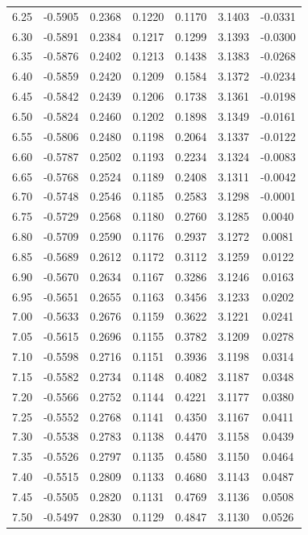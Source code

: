 \begin{longtable}{|c|c|c|c|c|c|c|}
6.25 & -0.5905 & 0.2368 & 0.1220 & 0.1170 & 3.1403 & -0.0331 \\
6.30 & -0.5891 & 0.2384 & 0.1217 & 0.1299 & 3.1393 & -0.0300 \\
6.35 & -0.5876 & 0.2402 & 0.1213 & 0.1438 & 3.1383 & -0.0268 \\
6.40 & -0.5859 & 0.2420 & 0.1209 & 0.1584 & 3.1372 & -0.0234 \\
6.45 & -0.5842 & 0.2439 & 0.1206 & 0.1738 & 3.1361 & -0.0198 \\
6.50 & -0.5824 & 0.2460 & 0.1202 & 0.1898 & 3.1349 & -0.0161 \\
6.55 & -0.5806 & 0.2480 & 0.1198 & 0.2064 & 3.1337 & -0.0122 \\
6.60 & -0.5787 & 0.2502 & 0.1193 & 0.2234 & 3.1324 & -0.0083 \\
6.65 & -0.5768 & 0.2524 & 0.1189 & 0.2408 & 3.1311 & -0.0042 \\
6.70 & -0.5748 & 0.2546 & 0.1185 & 0.2583 & 3.1298 & -0.0001 \\
6.75 & -0.5729 & 0.2568 & 0.1180 & 0.2760 & 3.1285 & 0.0040 \\
6.80 & -0.5709 & 0.2590 & 0.1176 & 0.2937 & 3.1272 & 0.0081 \\
6.85 & -0.5689 & 0.2612 & 0.1172 & 0.3112 & 3.1259 & 0.0122 \\
6.90 & -0.5670 & 0.2634 & 0.1167 & 0.3286 & 3.1246 & 0.0163 \\
6.95 & -0.5651 & 0.2655 & 0.1163 & 0.3456 & 3.1233 & 0.0202 \\
7.00 & -0.5633 & 0.2676 & 0.1159 & 0.3622 & 3.1221 & 0.0241 \\
7.05 & -0.5615 & 0.2696 & 0.1155 & 0.3782 & 3.1209 & 0.0278 \\
7.10 & -0.5598 & 0.2716 & 0.1151 & 0.3936 & 3.1198 & 0.0314 \\
7.15 & -0.5582 & 0.2734 & 0.1148 & 0.4082 & 3.1187 & 0.0348 \\
7.20 & -0.5566 & 0.2752 & 0.1144 & 0.4221 & 3.1177 & 0.0380 \\
7.25 & -0.5552 & 0.2768 & 0.1141 & 0.4350 & 3.1167 & 0.0411 \\
7.30 & -0.5538 & 0.2783 & 0.1138 & 0.4470 & 3.1158 & 0.0439 \\
7.35 & -0.5526 & 0.2797 & 0.1135 & 0.4580 & 3.1150 & 0.0464 \\
7.40 & -0.5515 & 0.2809 & 0.1133 & 0.4680 & 3.1143 & 0.0487 \\
7.45 & -0.5505 & 0.2820 & 0.1131 & 0.4769 & 3.1136 & 0.0508 \\
7.50 & -0.5497 & 0.2830 & 0.1129 & 0.4847 & 3.1130 & 0.0526 \\

\end{longtable}
